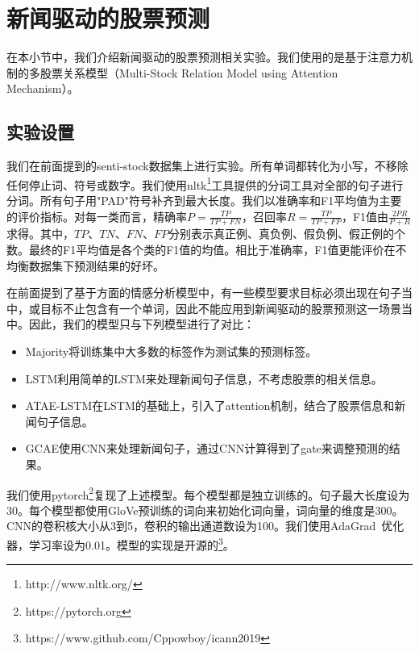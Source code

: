 \section{新闻驱动的股票预测}
在本小节中，我们介绍新闻驱动的股票预测相关实验。我们使用的是基于注意力机制的多股票关系模型（Multi-Stock Relation Model using Attention Mechanism）。
\subsection{实验设置}
我们在前面提到的senti-stock数据集上进行实验。所有单词都转化为小写，不移除任何停止词、符号或数字。我们使用nltk\footnote{http://www.nltk.org/}工具提供的分词工具对全部的句子进行分词。所有句子用"PAD"符号补齐到最大长度。我们以准确率和F1平均值为主要的评价指标。对每一类而言，精确率$P=\frac{TP}{TP+FN}$，召回率$R=\frac{TP}{TP+FP}$，F1值由$\frac{2PR}{P+R}$求得。其中，$TP$、$TN$、$FN$、$FP$分别表示真正例、真负例、假负例、假正例的个数。最终的F1平均值是各个类的F1值的均值。相比于准确率，F1值更能评价在不均衡数据集下预测结果的好坏。

在前面提到了基于方面的情感分析模型中，有一些模型要求目标必须出现在句子当中，或目标不止包含有一个单词，因此不能应用到新闻驱动的股票预测这一场景当中。因此，我们的模型只与下列模型进行了对比：
\begin{itemize}
    \item Majority将训练集中大多数的标签作为测试集的预测标签。
    \item LSTM利用简单的LSTM来处理新闻句子信息，不考虑股票的相关信息。
    \item ATAE-LSTM在LSTM的基础上，引入了attention机制，结合了股票信息和新闻句子信息。
    \item GCAE使用CNN来处理新闻句子，通过CNN计算得到了gate来调整预测的结果。
\end{itemize}
我们使用pytorch\footnote{https://pytorch.org}复现了上述模型。每个模型都是独立训练的。句子最大长度设为30。每个模型都使用GloVe\cite{pennington2014glove}预训练的词向来初始化词向量，词向量的维度是300。CNN的卷积核大小从3到5，卷积的输出通道数设为100。我们使用AdaGrad~\cite{duchi2011adaptive}优化器，学习率设为0.01。模型的实现是开源的\footnote{https://www.github.com/Cppowboy/icann2019}。
